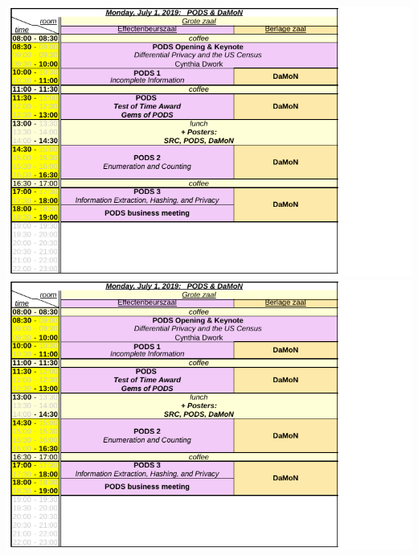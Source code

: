 \newpage

\ifodd\value{page}
\includegraphics[angle=90,width=\textwidth]{schedule/p2.pdf}%
\else
\includegraphics[angle=270,width=\textwidth]{schedule/p2.pdf}%
\fi

\newpage

